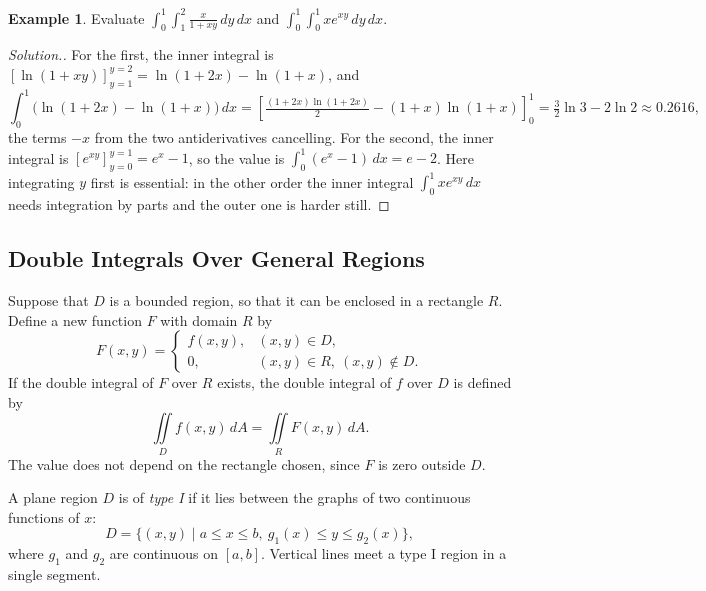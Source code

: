 \documentclass[11pt,a4paper]{article}
\theoremstyle{definition}
\newtheorem{exa}[thm]{Example}
\newenvironment{solution}
  {\renewcommand{\qedsymbol}{}\begin{proof}[\textit{Solution}.]}
  {\end{proof}}
\begin{document}
\begin{exa}
\label{ex:fubinilog}
Evaluate $\int_0^1\int_1^2 \frac{x}{1 + xy}\,dy\,dx$ and
$\int_0^1\int_0^1 xe^{xy}\,dy\,dx$.
\end{exa}

\begin{solution}
For the first, the inner integral is $\left[\ln(1 + xy)\right]_{y=1}^{y=2} =
\ln(1 + 2x) - \ln(1 + x)$, and
\[\int_0^1\big(\ln(1+2x) - \ln(1+x)\big)\,dx = \left[\tfrac{(1+2x)\ln(1+2x)}{2} -
(1+x)\ln(1+x)\right]_0^1 = \tfrac32\ln 3 - 2\ln 2\approx 0.2616 ,\]
the terms $-x$ from the two antiderivatives cancelling. For the second, the
inner integral is $\left[e^{xy}\right]_{y=0}^{y=1} = e^x - 1$, so the value is
$\int_0^1 (e^x - 1)\,dx = e - 2$. Here integrating $y$ first is essential: in
the other order the inner integral $\int_0^1 xe^{xy}\,dx$ needs integration by
parts and the outer one is harder still.
\end{solution}

{\color[wave]{485}\subsection{Double Integrals Over General Regions}}

Suppose that $D$ is a bounded region, so that it can be enclosed in a rectangle
$R$. Define a new function $F$ with domain $R$ by
\[ F(x,y) =
\begin{cases}
f(x,y), & (x,y)\in D,\\
0, & (x,y)\in R,\ (x,y)\notin D .
\end{cases}
\]
If the double integral of $F$ over $R$ exists, the double integral of $f$ over
$D$ is defined by
\[\iint\limits_D f(x,y)\,dA = \iint\limits_R F(x,y)\,dA .\]
The value does not depend on the rectangle chosen, since $F$ is zero outside
$D$.

A plane region $D$ is of \emph{type I} if it lies between the graphs of two
continuous functions of $x$:
\[ D = \{ (x,y) \mid a \leq x \leq b,\ g_1(x) \leq y\leq g_2(x)\},\]
where $g_1$ and $g_2$ are continuous on $[a,b]$. Vertical lines meet a type I
region in a single segment.
\end{document}
